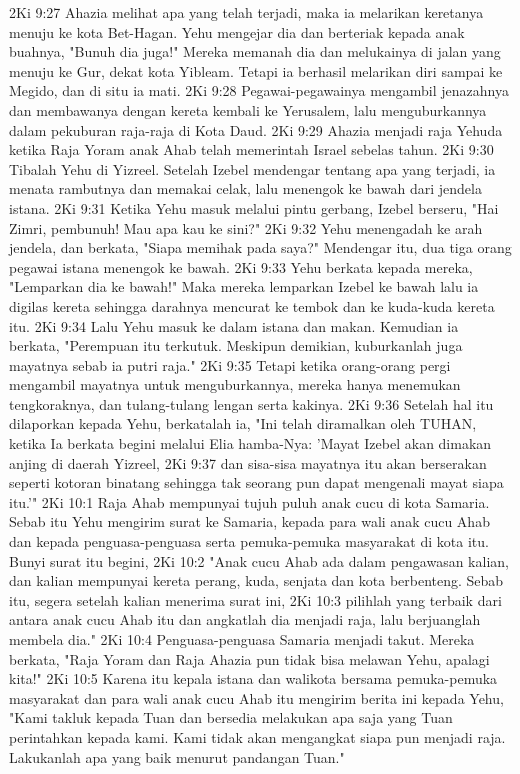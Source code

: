 2Ki 9:27  Ahazia melihat apa yang telah terjadi, maka ia melarikan keretanya menuju ke kota Bet-Hagan. Yehu mengejar dia dan berteriak kepada anak buahnya, "Bunuh dia juga!" Mereka memanah dia dan melukainya di jalan yang menuju ke Gur, dekat kota Yibleam. Tetapi ia berhasil melarikan diri sampai ke Megido, dan di situ ia mati.
2Ki 9:28  Pegawai-pegawainya mengambil jenazahnya dan membawanya dengan kereta kembali ke Yerusalem, lalu menguburkannya dalam pekuburan raja-raja di Kota Daud.
2Ki 9:29  Ahazia menjadi raja Yehuda ketika Raja Yoram anak Ahab telah memerintah Israel sebelas tahun.
2Ki 9:30  Tibalah Yehu di Yizreel. Setelah Izebel mendengar tentang apa yang terjadi, ia menata rambutnya dan memakai celak, lalu menengok ke bawah dari jendela istana.
2Ki 9:31  Ketika Yehu masuk melalui pintu gerbang, Izebel berseru, "Hai Zimri, pembunuh! Mau apa kau ke sini?"
2Ki 9:32  Yehu menengadah ke arah jendela, dan berkata, "Siapa memihak pada saya?" Mendengar itu, dua tiga orang pegawai istana menengok ke bawah.
2Ki 9:33  Yehu berkata kepada mereka, "Lemparkan dia ke bawah!" Maka mereka lemparkan Izebel ke bawah lalu ia digilas kereta sehingga darahnya mencurat ke tembok dan ke kuda-kuda kereta itu.
2Ki 9:34  Lalu Yehu masuk ke dalam istana dan makan. Kemudian ia berkata, "Perempuan itu terkutuk. Meskipun demikian, kuburkanlah juga mayatnya sebab ia putri raja."
2Ki 9:35  Tetapi ketika orang-orang pergi mengambil mayatnya untuk menguburkannya, mereka hanya menemukan tengkoraknya, dan tulang-tulang lengan serta kakinya.
2Ki 9:36  Setelah hal itu dilaporkan kepada Yehu, berkatalah ia, "Ini telah diramalkan oleh TUHAN, ketika Ia berkata begini melalui Elia hamba-Nya: 'Mayat Izebel akan dimakan anjing di daerah Yizreel,
2Ki 9:37  dan sisa-sisa mayatnya itu akan berserakan seperti kotoran binatang sehingga tak seorang pun dapat mengenali mayat siapa itu.'"
2Ki 10:1  Raja Ahab mempunyai tujuh puluh anak cucu di kota Samaria. Sebab itu Yehu mengirim surat ke Samaria, kepada para wali anak cucu Ahab dan kepada penguasa-penguasa serta pemuka-pemuka masyarakat di kota itu. Bunyi surat itu begini,
2Ki 10:2  "Anak cucu Ahab ada dalam pengawasan kalian, dan kalian mempunyai kereta perang, kuda, senjata dan kota berbenteng. Sebab itu, segera setelah kalian menerima surat ini,
2Ki 10:3  pilihlah yang terbaik dari antara anak cucu Ahab itu dan angkatlah dia menjadi raja, lalu berjuanglah membela dia."
2Ki 10:4  Penguasa-penguasa Samaria menjadi takut. Mereka berkata, "Raja Yoram dan Raja Ahazia pun tidak bisa melawan Yehu, apalagi kita!"
2Ki 10:5  Karena itu kepala istana dan walikota bersama pemuka-pemuka masyarakat dan para wali anak cucu Ahab itu mengirim berita ini kepada Yehu, "Kami takluk kepada Tuan dan bersedia melakukan apa saja yang Tuan perintahkan kepada kami. Kami tidak akan mengangkat siapa pun menjadi raja. Lakukanlah apa yang baik menurut pandangan Tuan."
